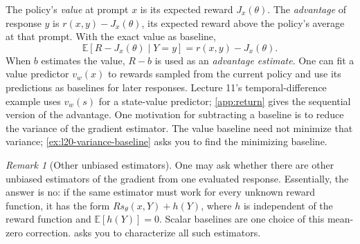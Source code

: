 \documentclass[11pt,twoside]{article}
\newcommand{\E}{\mathbb E}
\theoremstyle{definition}
\theoremstyle{remark}
\newtheorem{remark}[theorem]{Remark}
\begin{document}
The policy's \emph{value} at prompt $x$ is its expected reward
$J_x(\theta)$. The \emph{advantage} of response $y$ is
$r(x,y)-J_x(\theta)$, its expected reward above the policy's average at
that prompt. With the exact value as baseline,
\[
 \E[R-J_x(\theta)\mid Y=y]=r(x,y)-J_x(\theta).
\]
When $b$ estimates the value, $R-b$ is used as an \emph{advantage estimate}.
One can fit a value predictor $v_w(x)$ to rewards sampled from the current
policy and use its predictions as baselines for later responses.
Lecture 11's temporal-difference example uses $v_w(s)$ for a state-value
predictor; \cref{app:return} gives the sequential version of the advantage.
One motivation for subtracting a baseline is to reduce the variance of
the gradient estimator. The value baseline need not minimize that variance;
\cref{ex:l20-variance-baseline} asks you to find the minimizing baseline.

\begin{remark}[Other unbiased estimators]
\label{rem:score-characterization}
One may ask whether there are other unbiased estimators of the gradient
from one evaluated response. Essentially, the answer is no: if the same
estimator must work for every unknown reward function, it has the form
$R s_\theta(x,Y)+h(Y)$, where $h$ is independent of the reward
function and $\E[h(Y)]=0$. Scalar baselines are one choice of this
mean-zero correction.
 asks you to characterize all such estimators.
\end{remark}
\end{document}
